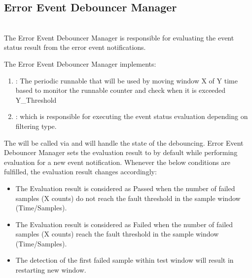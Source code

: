 {    
    
    
}

\subsection{Error Event Debouncer Manager}
\\
The Error Event Debouncer Manager is responsible for evaluating the event status result from the error event notifications.

The Error Event Debouncer Manager implements:
\begin{enumerate}
    \item {}: The periodic runnable that will be used by moving window X of Y time based to monitor the runnable counter and check when it is exceeded Y_Threshold
    \item {}: which is responsible for executing the event status evaluation depending on filtering type.
\end{enumerate} 

The  will be called via  and will handle the state of the debouncing.
Error Event Debouncer Manager sets the evaluation result to  by default while performing evaluation for a new event notification. Whenever the below conditions are fulfilled, 
the evaluation result changes accordingly:
\begin{itemize}
    \item The Evaluation result is considered as Passed when the number of failed samples (X counts) do not reach the fault threshold in the sample window (Time/Samples).
    \item The Evaluation result is considered as Failed when the number of failed samples (X counts) reach the fault threshold in the sample window (Time/Samples).
    \item The detection of the first failed sample within test window will result in restarting new window.
\end{itemize} 

{       }

